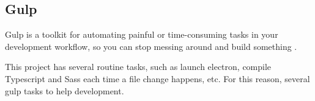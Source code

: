 
\subsection{Gulp}

Gulp is a toolkit for automating painful or time-consuming tasks in your
development workflow, so you can stop messing around and build something
\cite{gulp-web}.

This project has several routine tasks, such as launch electron, compile
Typescript and Sass each time a file change happens, etc. For this reason, 
several gulp tasks to help development.

